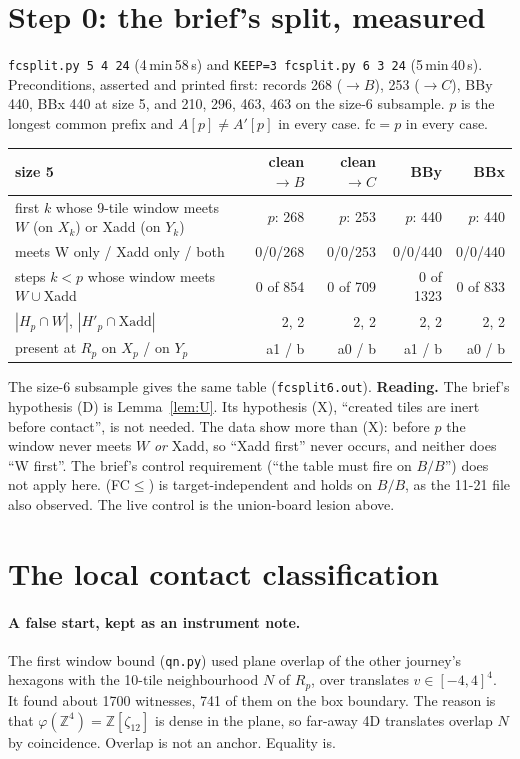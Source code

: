 \documentclass[11pt]{article}
\theoremstyle{definition}\newtheorem{definition}[theorem]{Definition}\newtheorem{remark}[theorem]{Remark}
\newcommand{\Z}{\mathbb Z}
\begin{document}
\section{Step 0: the brief's split, measured}\label{sec:step0}
\texttt{fcsplit.py 5 4 24} (4\,min\,58\,s) and \texttt{KEEP=3 fcsplit.py 6 3 24} (5\,min\,40\,s).
Preconditions, asserted and printed first: records 268 ($\to B$), 253 ($\to C$), BBy 440, BBx 440 at size 5, and 210, 296, 463, 463 on the size-6 subsample. $p$ is the longest common prefix and $A[p]\ne A'[p]$ in every case. $\mathrm{fc}=p$ in every case.
\begin{center}\begin{tabular}{lrrrr}\toprule
size 5 & clean$\to B$ & clean$\to C$ & BBy & BBx\\\midrule
first $k$ whose 9-tile window meets $W$ (on $X_k$) or Xadd (on $Y_k$) & $p$: 268 & $p$: 253 & $p$: 440 & $p$: 440\\
\quad meets W only / Xadd only / both & 0/0/268 & 0/0/253 & 0/0/440 & 0/0/440\\
steps $k<p$ whose window meets $W\cup$Xadd & 0 of 854 & 0 of 709 & 0 of 1323 & 0 of 833\\
$|H_p\cap W|$, $|H'_p\cap\mathrm{Xadd}|$ & 2, 2 & 2, 2 & 2, 2 & 2, 2\\
present at $R_p$ on $X_p$ / on $Y_p$ & a1 / b & a0 / b & a1 / b & a0 / b\\\bottomrule
\end{tabular}\end{center}
The size-6 subsample gives the same table (\texttt{fcsplit6.out}).
\textbf{Reading.} The brief's hypothesis (D) is Lemma~\ref{lem:U}. Its hypothesis (X), ``created tiles are inert before contact'', is not needed. The data show more than (X): before $p$ the window never meets $W$ \emph{or} Xadd, so ``Xadd first'' never occurs, and neither does ``W first''. The brief's control requirement (``the table must fire on $B/B$'') does not apply here. (FC$\le$) is target-independent and holds on $B/B$, as the 11-21 file also observed. The live control is the union-board lesion above.

\section{The local contact classification}\label{sec:local}
\paragraph{A false start, kept as an instrument note.} The first window bound (\texttt{qn.py}) used plane overlap of the other journey's hexagons with the 10-tile neighbourhood $N$ of $R_p$, over translates $v\in[-4,4]^4$. It found about 1700 witnesses, 741 of them on the box boundary. The reason is that $\varphi(\Z^4)=\Z[\zeta_{12}]$ is dense in the plane, so far-away 4D translates overlap $N$ by coincidence. Overlap is not an anchor. Equality is.
\end{document}
